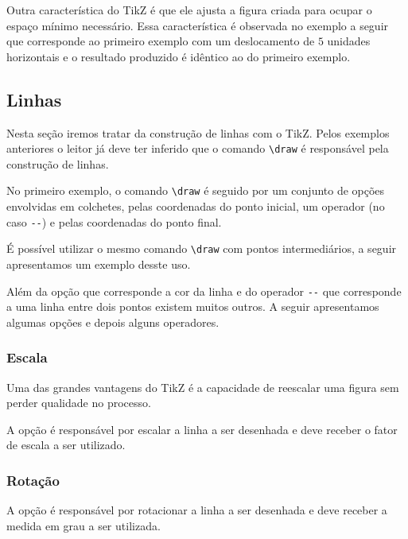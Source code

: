 Outra caracter\'{i}stica do TikZ \'{e} que ele ajusta a figura criada para ocupar o espa\c{c}o m\'{i}nimo necess\'{a}rio. Essa caracter\'{i}stica \'{e} observada no exemplo a seguir que corresponde ao primeiro exemplo com um deslocamento de $5$ unidades horizontais e o resultado produzido \'{e} id\^{e}ntico ao do primeiro exemplo. \\

\subsection{Linhas}
Nesta se\c{c}\~{a}o iremos tratar da constru\c{c}\~{a}o de linhas com o TikZ. Pelos exemplos anteriores o leitor j\'{a} deve ter inferido que o comando \lstinline!\draw! \'{e} respons\'{a}vel pela constru\c{c}\~{a}o de linhas.

No primeiro exemplo, o comando \lstinline!\draw! \'{e} seguido por um conjunto de op\c{c}\~{o}es envolvidas em colchetes, pelas coordenadas do ponto inicial, um operador (no caso \lstinline!--!) e pelas coordenadas do ponto final.

\'{E} poss\'{i}vel utilizar o mesmo comando \lstinline!\draw! com pontos intermedi\'{a}rios, a seguir apresentamos um exemplo desste uso. \\

Al\'{e}m da op\c{c}\~{a}o  que corresponde a cor da linha e do operador \lstinline!--! que corresponde a uma linha entre dois pontos existem muitos outros. A seguir apresentamos algumas op\c{c}\~{o}es e depois alguns operadores.

\subsubsection{Escala}
Uma das grandes vantagens do TikZ \'{e} a capacidade de reescalar uma figura sem perder qualidade no processo.

A op\c{c}\~{a}o  \'{e} respons\'{a}vel por escalar a linha a ser desenhada e deve receber o fator de escala a ser utilizado. \\

\subsubsection{Rota\c{c}\~{a}o}
A op\c{c}\~{a}o  \'{e} respons\'{a}vel por rotacionar a linha a ser desenhada e deve receber a medida em grau a ser utilizada. \\

